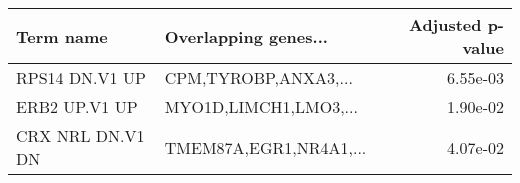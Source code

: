 \begin{tabular}{llr}
\toprule
       Term name &   Overlapping genes... &  Adjusted p-value \\
\midrule
  RPS14 DN.V1 UP &   CPM,TYROBP,ANXA3,... &          6.55e-03 \\
   ERB2 UP.V1 UP &  MYO1D,LIMCH1,LMO3,... &          1.90e-02 \\
CRX NRL DN.V1 DN & TMEM87A,EGR1,NR4A1,... &          4.07e-02 \\
\bottomrule
\end{tabular}
